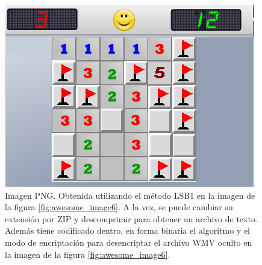 \documentclass[a4paper,10pt]{article}
\begin{document}
 
\begin{figure}[!htb]
\begin{center}
%
 \includegraphics[scale=0.5]{./images/miserables2-out.png}
  \caption{Imagen PNG. Obtenida utilizando el método LSB1 en la imagen de la figura \ref{fig:awesome_image6}. A la vez, se puede cambiar su extensión por ZIP y 
    descomprimir para obtener un archivo de texto. Además tiene codificado dentro, en forma binaria el algoritmo y el modo de encriptación para desencriptar
    el archivo WMV oculto en la imagen de la figura \ref{fig:awesome_image6}.}\label{fig:awesome_image9}
\endminipage
\end{center}
\end{figure}
\end{document}
